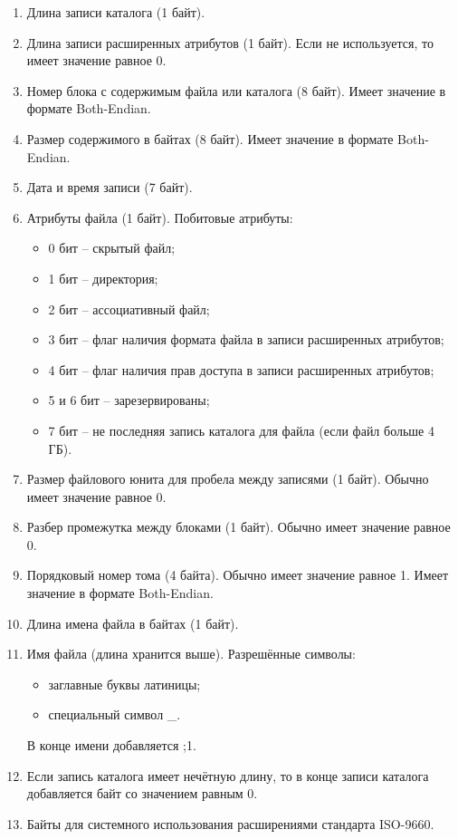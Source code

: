 \begin{enumerate}
\item Длина записи каталога (1 байт).
\item Длина записи расширенных атрибутов (1 байт). Если не используется, то имеет значение равное 0.
\item Номер блока с содержимым файла или каталога (8 байт). Имеет значение в формате Both-Endian.
\item Размер содержимого в байтах (8 байт). Имеет значение в формате Both-Endian.
\item Дата и время записи (7 байт).
\item Атрибуты файла (1 байт). Побитовые атрибуты:

	\begin{itemize}
	\item 0 бит -- скрытый файл;
	\item 1 бит -- директория;
	\item 2 бит -- ассоциативный файл;
	\item 3 бит -- флаг наличия формата файла в записи расширенных атрибутов;
	\item 4 бит -- флаг наличия прав доступа в записи расширенных атрибутов;
	\item 5 и 6 бит -- зарезервированы;
	\item 7 бит -- не последняя запись каталога для файла (если файл больше 4 ГБ).
	\end{itemize}
	
\item Размер файлового юнита для пробела между записями (1 байт). Обычно имеет значение равное 0. 
\item Разбер промежутка между блоками (1 байт). Обычно имеет значение равное 0. 
\item Порядковый номер тома (4 байта). Обычно имеет значение равное 1. Имеет значение в формате Both-Endian.
\item Длина имена файла в байтах (1 байт).
\item Имя файла (длина хранится выше). Разрешённые символы:

	\begin{itemize}
	\item заглавные буквы латиницы;
	\item специальный символ \_.
	\end{itemize}
	
В конце имени добавляется \textquotedbl;1\textquotedbl.
\item Если запись каталога имеет нечётную длину, то в конце записи каталога добавляется байт со значением равным 0.
\item Байты для системного использования расширениями стандарта ISO-9660.
\end{enumerate}

